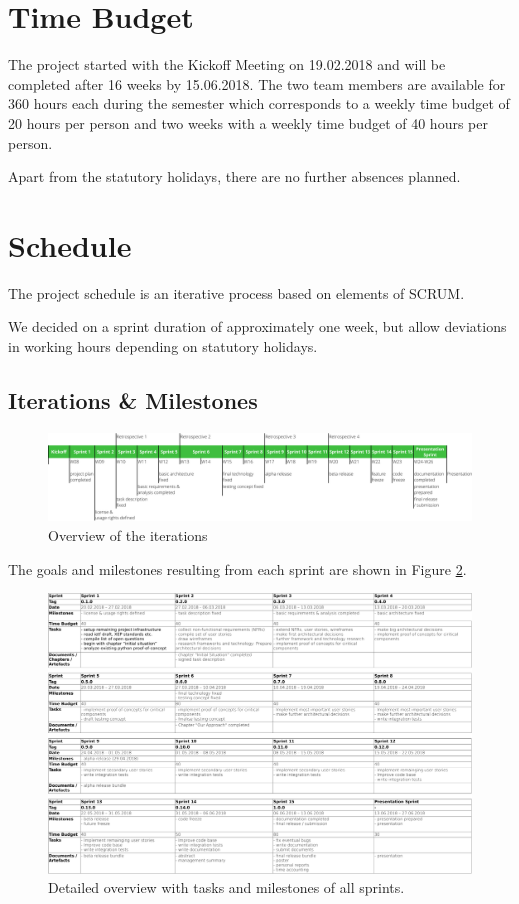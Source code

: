 \section{Time Budget}
The project started with the Kickoff Meeting on 19.02.2018 and will be completed after 16 weeks by 15.06.2018.
The two team members are available for 360 hours each during the semester which corresponds to a weekly time budget of 20 hours per person and two weeks with a weekly time budget of 40 hours per person.

Apart from the statutory holidays, there are no further absences planned.

\section{Schedule}
The project schedule is an iterative process based on elements of SCRUM.

We decided on a sprint duration of approximately one week, but allow deviations in working hours depending on statutory holidays.

\subsection{Iterations \& Milestones}
\begin{figure}[h!]
    \centering
    \includegraphics[width=1\linewidth]{resources/overview}
    \caption{Overview of the iterations}
    \label{fig:overview}
\end{figure}

The goals and milestones resulting from each sprint are shown in Figure \ref{fig:sprint-details}.

\begin{figure}[h]
    \begin{sideways}
    \includegraphics[scale=0.75]{resources/sprint_details}
    \end{sideways}
    \centering
    \caption{Detailed overview with tasks and milestones of all sprints.}
    \label{fig:sprint-details}
\end{figure}


